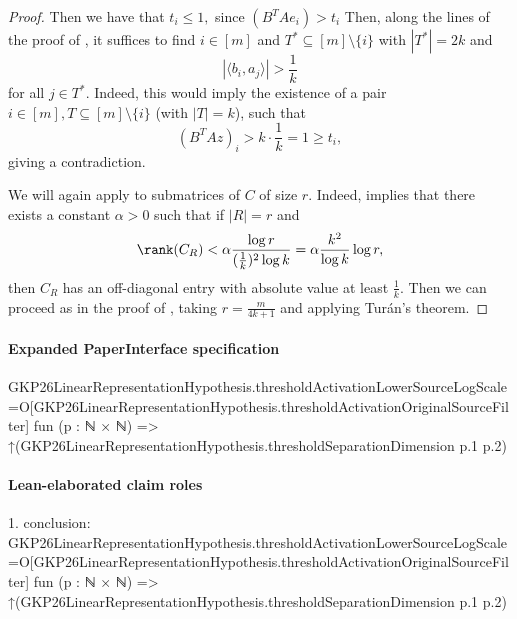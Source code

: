 \documentclass[10pt]{article}
\begin{document}
\begin{ReviewVerbatim}
\begin{proof}
    Then we have that $t_i \le 1,$ since $(B^TAe_i) > t_i$ Then, along the lines of the proof of , it suffices to find $i\in [m]$ and $T^*\subseteq [m]\setminus \{i\}$ with $|T^*|=2k$ and
    \begin{equation}
        |\langle b_i, a_j \rangle| > \frac{1}{k}
    \end{equation}
    for all $j\in T^*$. Indeed, this would imply the existence of a pair $i\in [m], T\subseteq [m]\setminus\{i\}$ (with $|T|=k$), such that
    \begin{equation}
        (B^TAz)_i > k\cdot \frac{1}{k} = 1 \ge t_i,
    \end{equation}
    giving a contradiction.

    We will again apply  to submatrices of $C$ of size $r$. Indeed,  implies that there exists a constant $\alpha > 0$ such that if $|R|=r$ and
    \begin{equation}
        \rank(C_R) < \alpha \frac{\log r}{(\frac{1}{k})^2\log k} = \alpha \frac{k^2}{\log k}\log r,
    \end{equation}
    then $C_R$ has an off-diagonal entry with absolute value at least $\frac{1}{k}.$ Then we can proceed as in the proof of , taking $r = \frac{m}{4k+1}$ and applying Tur\'an's theorem.
\end{proof}
\end{ReviewVerbatim}



\paragraph{Expanded PaperInterface specification}
\begin{ReviewVerbatim}
GKP26LinearRepresentationHypothesis.thresholdActivationLowerSourceLogScale =O[GKP26LinearRepresentationHypothesis.thresholdActivationOriginalSourceFilter]
  fun (p : ℕ × ℕ) => ↑(GKP26LinearRepresentationHypothesis.thresholdSeparationDimension p.1 p.2)
\end{ReviewVerbatim}

\paragraph{Lean-elaborated claim roles}\begin{ReviewVerbatim}
1. conclusion: GKP26LinearRepresentationHypothesis.thresholdActivationLowerSourceLogScale =O[GKP26LinearRepresentationHypothesis.thresholdActivationOriginalSourceFilter]
  fun (p : ℕ × ℕ) => ↑(GKP26LinearRepresentationHypothesis.thresholdSeparationDimension p.1 p.2)
\end{ReviewVerbatim}
\end{document}
